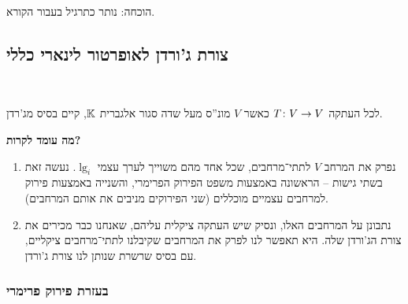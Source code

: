 \documentclass[name=רשימות אלגברה לינארית 2א]{../../../tex/classes/megasumPreamble}
\begin{document}
	הוכחה: נותר כתרגיל בעבור הקורא. 
	
	\subsection{צורת ג'ורדן לאופרטור לינארי כללי}\ 
	
	
	
	\begin{Theorem}
		לכל העתקה $T \colon V \to V$ כאשר $V$ מונ''ס מעל שדה סגור אלגברית $\mathbb{K}$, קיים בסיס מג'רדן. 
	\end{Theorem}
	
	\textbf{מה עומד לקרות? }
	\begin{enumerate}
		\item נפרק את המרחב $V$ לתתי־מרחבים, שכל אחד מהם משוייך לערך עצמי $\lg_i$. נעשה זאת בשתי גישות – הראשונה באמצעות משפט הפירוק הפרימרי, והשנייה באמצעות פירוק למרחבים עצמיים מוכללים (שני הפירוקים מניבים את אותם המרחבים). 
		\item נתבונן על המרחבים האלו, ונסיק שיש העתקה ציקלית עליהם, שאנחנו כבר מכירים את צורת הג'ורדן שלה. היא תאפשר לנו לפרק את המרחבים שקיבלנו לתתי־מרחבים ציקליים, עם בסיס שרשרת שנותן לנו צורת ג'ורדן. 
	\end{enumerate}
	
	\subsubsection{בעזרת פירוק פרימרי}
	
\end{document}
